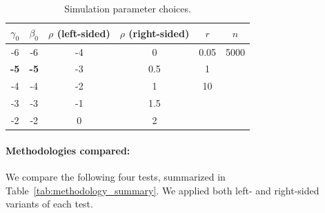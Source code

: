\documentclass[12pt]{article}
\theoremstyle{definition}
\begin{document}
\begin{table}[!h]
  \centering
  \begin{tabular}{c|c|c|c|c|c}
  $\gamma_0$ & $\beta_0$ & $\rho$ (left-sided) & $\rho$ (right-sided) & $r$ & $n$ \\
  \hline
  -6 & -6 & -4 & 0 & 0.05 & 5000 \\
  \textbf{-5} & \textbf{-5} & -3 & 0.5 & 1 & \\
  -4 & -4 & -2 & 1 & 10 & \\
  -3 & -3 & -1 & 1.5 & & \\
  -2 & -2 & 0 & 2 & & \\
  \end{tabular}
\caption{Simulation parameter choices.}
\label{tab:simulation_parameter}
\end{table}

\paragraph{Methodologies compared:}

We compare the following four tests, summarized in Table~\ref{tab:methodology_summary}. We applied both left- and right-sided variants of each test.
\end{document}
